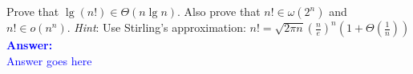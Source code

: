 \item{}
Prove that $\lg\left(n!\right)\in\Theta\left(n\lg n\right)$. Also prove that
$n!\in\omega\left(2^n\right)$ and $n!\in o\left(n^n\right)$.\parend
\emph{Hint}\/: Use Stirling's approximation: $n!=\sqrt{2\pi n}\left(\frac{n}{e}
\right)^n\left(1+\Theta\left(\frac{1}{n}\right)\right)$\\[12pt]
\ifanswers
\textcolor{blue}{
\textbf{Answer:}\\
Answer goes here
}
\newpage
\fi
